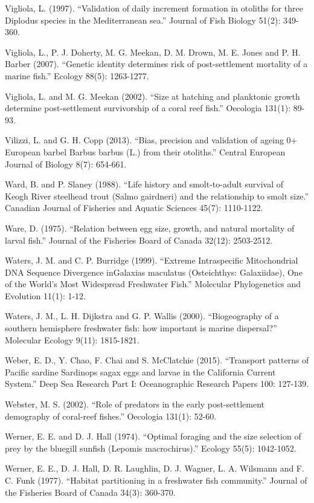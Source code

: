 \documentclass[]{book}
\begin{document}
Vigliola, L. (1997). ``Validation of daily increment formation in
otoliths for three Diplodus species in the Mediterranean sea.'' Journal
of Fish Biology 51(2): 349-360.

Vigliola, L., P. J. Doherty, M. G. Meekan, D. M. Drown, M. E. Jones and
P. H. Barber (2007). ``Genetic identity determines risk of
post-settlement mortality of a marine fish.'' Ecology 88(5): 1263-1277.

Vigliola, L. and M. G. Meekan (2002). ``Size at hatching and planktonic
growth determine post-settlement survivorship of a coral reef fish.''
Oecologia 131(1): 89-93.

Vilizzi, L. and G. H. Copp (2013). ``Bias, precision and validation of
ageing 0+ European barbel Barbus barbus (L.) from their otoliths.''
Central European Journal of Biology 8(7): 654-661.

Ward, B. and P. Slaney (1988). ``Life history and smolt-to-adult
survival of Keogh River steelhead trout (Salmo gairdneri) and the
relationship to smolt size.'' Canadian Journal of Fisheries and Aquatic
Sciences 45(7): 1110-1122.

Ware, D. (1975). ``Relation between egg size, growth, and natural
mortality of larval fish.'' Journal of the Fisheries Board of Canada
32(12): 2503-2512.

Waters, J. M. and C. P. Burridge (1999). ``Extreme Intraspecific
Mitochondrial DNA Sequence Divergence inGalaxias maculatus (Osteichthys:
Galaxiidae), One of the World's Most Widespread Freshwater Fish.''
Molecular Phylogenetics and Evolution 11(1): 1-12.

Waters, J. M., L. H. Dijkstra and G. P. Wallis (2000). ``Biogeography of
a southern hemisphere freshwater fish: how important is marine
dispersal?'' Molecular Ecology 9(11): 1815-1821.

Weber, E. D., Y. Chao, F. Chai and S. McClatchie (2015). ``Transport
patterns of Pacific sardine Sardinops sagax eggs and larvae in the
California Current System.'' Deep Sea Research Part I: Oceanographic
Research Papers 100: 127-139.

Webster, M. S. (2002). ``Role of predators in the early post-settlement
demography of coral-reef fishes.'' Oecologia 131(1): 52-60.

Werner, E. E. and D. J. Hall (1974). ``Optimal foraging and the size
selection of prey by the bluegill sunfish (Lepomis macrochirus).''
Ecology 55(5): 1042-1052.

Werner, E. E., D. J. Hall, D. R. Laughlin, D. J. Wagner, L. A. Wilsmann
and F. C. Funk (1977). ``Habitat partitioning in a freshwater fish
community.'' Journal of the Fisheries Board of Canada 34(3): 360-370.
\end{document}
